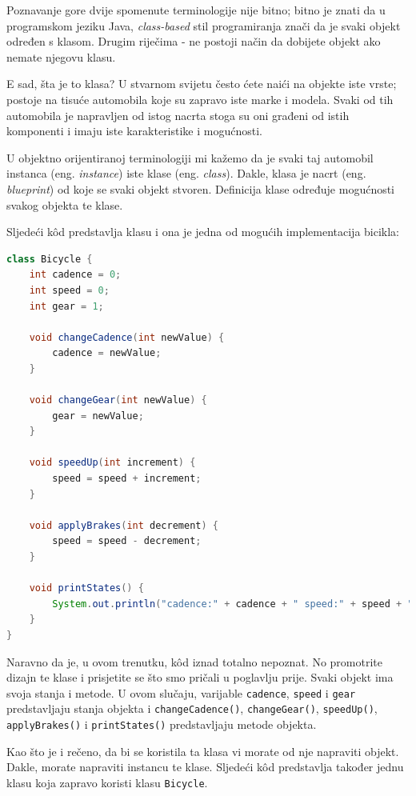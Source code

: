 Poznavanje gore dvije spomenute terminologije nije bitno; bitno je znati da u programskom jeziku Java, \emph{class-based} stil programiranja znači da je svaki objekt određen s klasom. Drugim riječima - ne postoji način da dobijete objekt ako nemate njegovu klasu.

E sad, šta je to klasa? U stvarnom svijetu često ćete naići na objekte iste vrste; postoje na tisuće automobila koje su zapravo iste marke i modela. Svaki od tih automobila je napravljen od istog nacrta stoga su oni građeni od istih komponenti i imaju iste karakteristike i mogućnosti.

U objektno orijentiranoj terminologiji mi kažemo da je svaki taj automobil instanca (eng. \emph{instance}) iste klase (eng. \emph{class}). Dakle, klasa je nacrt (eng. \emph{blueprint}) od koje se svaki objekt stvoren. Definicija klase određuje mogućnosti svakog objekta te klase.

Sljedeći kôd predstavlja klasu i ona je jedna od mogućih implementacija bicikla:~\cite{javatutorials}

\begin{lstlisting}[language=java, caption=Bicycle]
class Bicycle {
    int cadence = 0;
    int speed = 0;
    int gear = 1;
    
    void changeCadence(int newValue) {
        cadence = newValue;
    }
    
    void changeGear(int newValue) {
        gear = newValue;
    }
    
    void speedUp(int increment) {
        speed = speed + increment;
    }
    
    void applyBrakes(int decrement) {
        speed = speed - decrement;
    }
    
    void printStates() {
        System.out.println("cadence:" + cadence + " speed:" + speed + " gear:" + gear);
    }
}
\end{lstlisting}

Naravno da je, u ovom trenutku, kôd iznad totalno nepoznat. No promotrite dizajn te klase i prisjetite se što smo pričali u poglavlju prije. Svaki objekt ima svoja stanja i metode. U ovom slučaju, varijable \texttt{cadence}, \texttt{speed} i \texttt{gear} predstavljaju stanja objekta i \texttt{changeCadence()}, \texttt{changeGear()}, \texttt{speedUp()}, \texttt{applyBrakes()} i \texttt{printStates()} predstavljaju metode objekta.

Kao što je i rečeno, da bi se koristila ta klasa vi morate od nje napraviti objekt. Dakle, morate napraviti instancu te klase. Sljedeći kôd predstavlja također jednu klasu koja zapravo koristi klasu \texttt{Bicycle}.~\cite{javatutorials}


